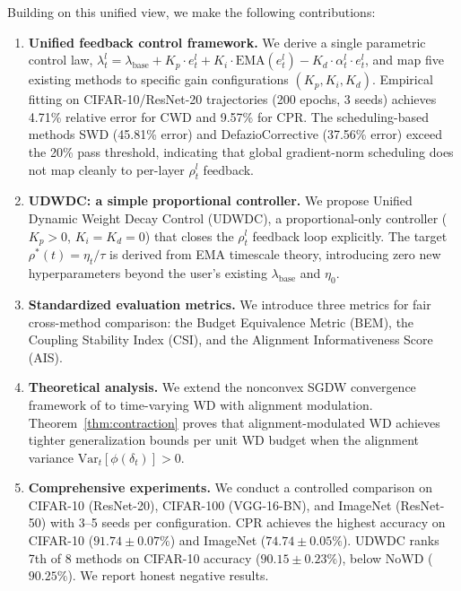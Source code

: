 \documentclass{article}
\begin{document}
Building on this unified view, we make the following contributions:

\begin{enumerate}
\item \textbf{Unified feedback control framework.} We derive a single parametric control law, $\lambda_t^l = \lambda_{\text{base}} + K_p \cdot e_t^l + K_i \cdot \text{EMA}(e_t^l) - K_d \cdot \alpha_t^l \cdot e_t^l$, and map five existing methods to specific gain configurations $(K_p, K_i, K_d)$. Empirical fitting on CIFAR-10/ResNet-20 trajectories (200 epochs, 3 seeds) achieves 4.71\% relative error for CWD and 9.57\% for CPR. The scheduling-based methods SWD (45.81\% error) and DefazioCorrective (37.56\% error) exceed the 20\% pass threshold, indicating that global gradient-norm scheduling does not map cleanly to per-layer $\rho_t^l$ feedback.

\item \textbf{UDWDC: a simple proportional controller.} We propose Unified Dynamic Weight Decay Control (UDWDC), a proportional-only controller ($K_p > 0$, $K_i = K_d = 0$) that closes the $\rho_t^l$ feedback loop explicitly. The target $\rho^*(t) = \eta_t / \tau$ is derived from EMA timescale theory, introducing zero new hyperparameters beyond the user's existing $\lambda_{\text{base}}$ and $\eta_0$.

\item \textbf{Standardized evaluation metrics.} We introduce three metrics for fair cross-method comparison: the Budget Equivalence Metric (BEM), the Coupling Stability Index (CSI), and the Alignment Informativeness Score (AIS).

\item \textbf{Theoretical analysis.} We extend the nonconvex SGDW convergence framework of \citet{sun2025wd} to time-varying WD with alignment modulation. Theorem~\ref{thm:contraction} proves that alignment-modulated WD achieves tighter generalization bounds per unit WD budget when the alignment variance $\text{Var}_t[\phi(\delta_t)] > 0$.

\item \textbf{Comprehensive experiments.} We conduct a controlled comparison on CIFAR-10 (ResNet-20), CIFAR-100 (VGG-16-BN), and ImageNet (ResNet-50) with 3--5 seeds per configuration. CPR achieves the highest accuracy on CIFAR-10 ($91.74 \pm 0.07\%$) and ImageNet ($74.74 \pm 0.05\%$). UDWDC ranks 7th of 8 methods on CIFAR-10 accuracy ($90.15 \pm 0.23\%$), below NoWD ($90.25\%$). We report honest negative results.
\end{enumerate}
\end{document}
